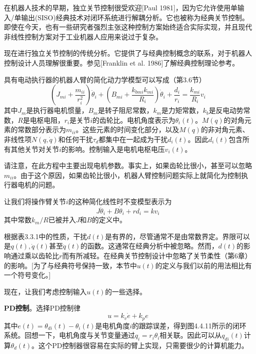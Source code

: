 \documentclass[UTF8]{ctexart}
\theoremstyle{definition}
\begin{document}
在机器人技术的早期，独立关节控制很受欢迎[Paul 1981]，因为它允许使用单输入/单输出(SISO)经典技术对闭环系统进行解耦分析。它也被称为经典关节控制。即使在今天，也有一些研究者强烈主张这种控制方案始终适合实际实现，并且现代非线性控制方案对于工业机器人应用来说过于复杂。

现在进行独立关节控制的传统分析。它提供了与经典控制概念的联系，对于机器人控制设计人员理解很重要。参见[Franklin et al. 1986]了解经典控制理论参考。

具有电动执行器的机器人臂的简化动力学模型可以写成（第3.6节）
\begin{equation}
    \left(J_{mi} + \frac{m_{ii}}{r_i^2}\right)\ddot{\theta}_i + \left(B_{mi} + \frac{k_{bmi}k_{mi}}{R_i}\right)\dot{\theta}_i + \frac{d_i}{r_i} = \frac{k_{mi}}{R_i}v_i
\end{equation}
其中$J_m$是执行器电机惯量，$B_m$是转子阻尼常数，$k_m$是力矩常数，$k_b$是反电动势常数，$R$是电枢电阻，$r_i$是关节$i$的齿轮比。电机角度表示为$\theta_i(t)$。$M(q)$的对角元素的常数部分表示为$m_{ii}$。这些元素的时间变化部分，以及$M(q)$的非对角元素、非线性项$N(q, \dot{q})$和任何干扰$\tau_d$都集中在一起成为干扰$d_i(t)$。因此$d_i(t)$包含所有其他关节对关节$i$的影响。控制输入是电机电枢电压$v_i(t)$。

请注意，在此方程中主要出现电机参数。事实上，如果齿轮比很小，甚至可以忽略$m_{ii}$。由于这个原因，如果齿轮比很小，机器人臂控制问题实际上就简化为控制执行器电机的问题。

让我们将操作臂关节$i$的这种简化线性时不变模型表示为
\begin{equation}
    J\ddot{\theta}_i + B\dot{\theta}_i + r d_i = k v_i
\end{equation}
其中常数$k_m/R$已被并入$J$和$B$的定义中。

根据表3.3.1中的性质，干扰$d(t)$是有界的，尽管通常不是由常数界定。界限可以是$q(t), \dot{q}(t)$甚至$\ddot{q}(t)$的函数。这通常在经典分析中被忽略。然而，$d(t)$的影响通过乘以齿轮比$r$而有所减轻。在经典关节控制设计中忽略了关节柔性（第6章）的影响。[为了与经典符号保持一致，本节中$u(t)$的定义与我们以前的用法相比有一个符号变化。]

现在，让我们考虑控制输入$u(t)$的一些选择。

\textbf{PD控制}。选择PD控制律
\begin{equation}
    u = k_v\dot{e} + k_pe
\end{equation}
其中$e(t) = \theta_{di}(t) - \theta_i(t)$是电机角度$i$的跟踪误差，得到图4.4.11所示的闭环系统。回想一下，电机角度与关节变量通过$q_i = r_i\theta_i$相关联。因此可以从$q_{di}(t)$计算$\theta_d(t)$。这个PD控制器很容易在实际的臂上实现，只需要很少的计算机能力。
\end{document}
